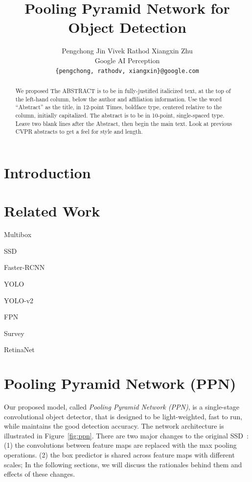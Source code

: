 \documentclass[10pt,twocolumn,letterpaper]{article}
\begin{document}
\title{Pooling Pyramid Network for Object Detection}

\author{
Pengchong Jin
\hspace*{32pt}
Vivek Rathod
\hspace*{32pt}
Xiangxin Zhu
\\
Google AI Perception\\
{\tt\small \{pengchong, rathodv, xiangxin\}@google.com}
}


\maketitle

\begin{abstract}
We proposed 
   The ABSTRACT is to be in fully-justified italicized text, at the top
   of the left-hand column, below the author and affiliation
   information. Use the word ``Abstract'' as the title, in 12-point
   Times, boldface type, centered relative to the column, initially
   capitalized. The abstract is to be in 10-point, single-spaced type.
   Leave two blank lines after the Abstract, then begin the main text.
   Look at previous CVPR abstracts to get a feel for style and length.
\end{abstract}

\section{Introduction}

\section{Related Work}

Multibox~\cite{erhan2014multibox}

SSD~\cite{liu2016ssd}

Faster-RCNN~\cite{ren2015frcnn}

YOLO~\cite{redmon2016yolo}

YOLO-v2~\cite{redmon2017yolov2}

FPN~\cite{lin2017fpn}

Survey~\cite{huang2017gmi}

RetinaNet~\cite{lin2017focal}

\section{Pooling Pyramid Network (PPN)}
Our proposed model, called \textit{Pooling Pyramid Network (PPN)},
is a single-stage convolutional object detector,
that is designed to be light-weighted, fast to run,
while maintains the good detection accuracy.
The network architecture is illustrated in Figure~\ref{fig:ppn}.
There are two major changes to the original SSD~\cite{liu2016ssd}:
(1) the convolutions between feature maps are replaced with the max pooling operations.
(2) the box predictor is shared across feature maps with different scales;
In the following sections, we will discuss the rationales behind them and effects of these changes.
\end{document}
